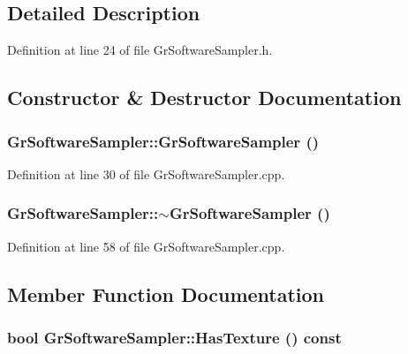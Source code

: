 \subsection{Detailed Description}


Definition at line 24 of file GrSoftwareSampler.h.

\subsection{Constructor \& Destructor Documentation}
\hypertarget{class_gr_software_sampler_33e593352c54e408f06a1c6b3120927a}{
\subsubsection[{GrSoftwareSampler}]{\setlength{\rightskip}{0pt plus 5cm}GrSoftwareSampler::GrSoftwareSampler ()}}
\label{class_gr_software_sampler_33e593352c54e408f06a1c6b3120927a}




Definition at line 30 of file GrSoftwareSampler.cpp.\hypertarget{class_gr_software_sampler_35e7eaef6a419acd7cf671b47fa752c3}{
\subsubsection[{$\sim$GrSoftwareSampler}]{\setlength{\rightskip}{0pt plus 5cm}GrSoftwareSampler::$\sim$GrSoftwareSampler ()}}
\label{class_gr_software_sampler_35e7eaef6a419acd7cf671b47fa752c3}




Definition at line 58 of file GrSoftwareSampler.cpp.

\subsection{Member Function Documentation}
\hypertarget{class_gr_software_sampler_e8e20b7c9be530eac1326a568f4549a8}{
\subsubsection[{HasTexture}]{\setlength{\rightskip}{0pt plus 5cm}bool GrSoftwareSampler::HasTexture () const}}
\label{class_gr_software_sampler_e8e20b7c9be530eac1326a568f4549a8}




